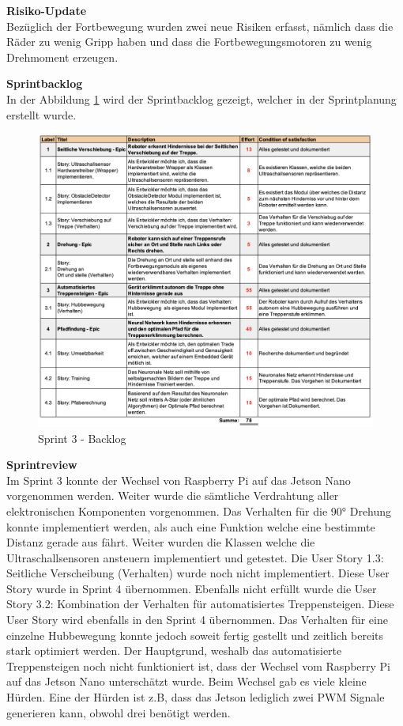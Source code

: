 \textbf{Risiko-Update}\\
Bezüglich der Fortbewegung wurden zwei neue Risiken erfasst, nämlich dass die Räder zu wenig Gripp haben und dass die Fortbewegungsmotoren zu wenig Drehmoment erzeugen.

\textbf{Sprintbacklog}\\
In der Abbildung \ref{fig:sprint-backlog-3} wird der Sprintbacklog gezeigt, welcher in der Sprintplanung erstellt wurde.
\begin{figure}[H]
  \includegraphics[width=1.0\textwidth]{img/projektmanagement/Sprint 3.png}
  \centering
  \caption{Sprint 3 - Backlog}
  \label{fig:sprint-backlog-3}
\end{figure}

\newpage

\textbf{Sprintreview}\\
Im Sprint 3 konnte der Wechsel von Raspberry Pi auf das Jetson Nano vorgenommen werden. Weiter wurde die sämtliche Verdrahtung aller elektronischen Komponenten vorgenommen. Das Verhalten für die 90° Drehung konnte implementiert werden, als auch eine Funktion welche eine bestimmte Distanz gerade aus fährt. Weiter wurden die Klassen welche die Ultraschallsensoren ansteuern implementiert und getestet. Die User Story 1.3: Seitliche Verscheibung (Verhalten) wurde noch nicht implementiert. Diese User Story wurde in Sprint 4 übernommen. Ebenfalls nicht erfüllt wurde die User Story 3.2: Kombination der Verhalten für automatisiertes Treppensteigen. Diese User Story wird ebenfalls in den Sprint 4 übernommen. Das Verhalten für eine einzelne Hubbewegung konnte jedoch soweit fertig gestellt und zeitlich bereits stark optimiert werden. Der Hauptgrund, weshalb das automatisierte Treppensteigen noch nicht funktioniert ist, dass der Wechsel vom Raspberry Pi auf das Jetson Nano unterschätzt wurde. Beim Wechsel gab es viele kleine Hürden. Eine der Hürden ist z.B, dass das Jetson lediglich zwei PWM Signale generieren kann, obwohl drei benötigt werden.

